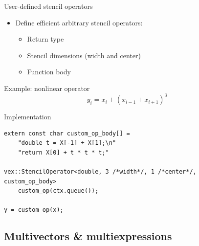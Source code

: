 \documentclass[@BEAMER_OPTIONS@]{beamer}
\begin{document}
\begin{frame}[fragile]{User-defined stencil operators}
    \begin{itemize}
        \item Define efficient arbitrary stencil operators:
            \begin{itemize}
                \item Return type
                \item Stencil dimensions (width and center)
                \item Function body
            \end{itemize}
    \end{itemize}
    \begin{block}{Example: nonlinear operator}
        \begin{equation*}
            y_i = x_i + \left( x_{i-1} + x_{i+1} \right)^3
        \end{equation*}
    \end{block}
    \begin{exampleblock}{Implementation}
        \begin{lstlisting}
extern const char custom_op_body[] =
    "double t = X[-1] + X[1];\n"
    "return X[0] + t * t * t;"

vex::StencilOperator<double, 3 /*width*/, 1 /*center*/, custom_op_body>
    custom_op(ctx.queue());

y = custom_op(x);
        \end{lstlisting}
    \end{exampleblock}
\end{frame}


\subsection{Multivectors \& multiexpressions}
\end{document}
